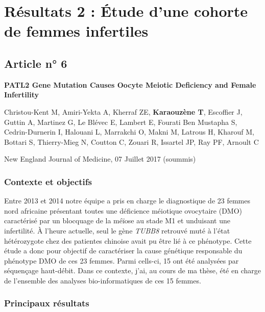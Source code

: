\documentclass[12pt,twoside]{reedthesis}
\theoremstyle{definition}
\theoremstyle{definition}
\theoremstyle{remark}
\begin{document}
  \section{Résultats 2 : Étude d'une cohorte de femmes
  infertiles}\label{resultats-2-etude-dune-cohorte-de-femmes-infertiles}
  
  \subsection{Article n° 6}\label{article-n-6}
  
  \textbf{PATL2 Gene Mutation Causes Oocyte Meiotic Deficiency and Female
  Infertility}
  
  Christou-Kent M, Amiri-Yekta A, Kherraf ZE, \textbf{Karaouzène T},
  Escoffier J, Guttin A, Martinez G, Le Blévec E, Lambert E, Fourati Ben
  Mustapha S, Cedrin-Durnerin I, Halouani L, Marrakchi O, Makni M, Latrous
  H, Kharouf M, Bottari S, Thierry-Mieg N, Coutton C, Zouari R, Issartel
  JP, Ray PF, Arnoult C
  
  New England Journal of Medicine, 07 Juillet 2017 (soummis)
  
  \newpage
  
  \subsubsection{Contexte et objectifs}\label{contexte-et-objectifs-5}
  
  Entre 2013 et 2014 notre équipe a pris en charge le diagnostique de 23
  femmes nord africaine présentant toutes une déficience méiotique
  ovocytaire (DMO) caractérisé par un blocquage de la méïose au stade M1
  et unduisant une infertilité. À l'heure actuelle, seul le gène
  \emph{TUBB8} retrouvé muté à l'état hétérozygote chez des patientes
  chinoise avait pu être lié à ce phénotype. Cette étude a donc pour
  objectif de caractériser la cause génétique responsable du phénotype DMO
  de ces 23 femmes. Parmi cells-ci, 15 ont été analysées par séquençage
  haut-débit. Dans ce contexte, j'ai, au cours de ma thèse, été en charge
  de l'ensemble des analyses bio-informatiques de ces 15 femmes.
  
  \newpage
  
  
  
  \newpage
  
  \subsubsection{Principaux résultats}\label{principaux-resultats-5}
  
\end{document}
